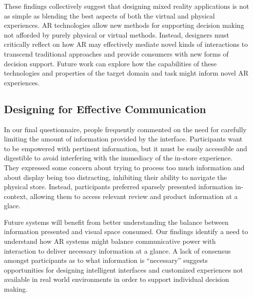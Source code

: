 These findings collectively suggest that designing mixed reality applications is not as simple as blending the best aspects of both the virtual and physical experiences. AR technologies allow new methods for supporting decision making not afforded by purely physical or virtual methods. Instead, designers must critically reflect on how AR may effectively mediate novel kinds of interactions to transcend traditional approaches and provide consumers with new forms of decision support. Future work can explore how the capabilities of these technologies and properties of the target domain and task might inform novel AR experiences.

\subsection{Designing for Effective Communication}
In our final questionnaire, people frequently commented on the need for carefully limiting the amount of information provided by the interface.  %
Participants want to be empowered with pertinent information, but it must be easily accessible and digestible to avoid interfering with the immediacy of the in-store experience. They expressed some concern about trying to process too much information and about display being too distracting, inhibiting their ability to navigate the physical store. Instead, participants preferred sparsely presented information in-context, allowing them to access relevant review and product information at a glace. 

Future systems will benefit from better understanding the balance between information presented and visual space consumed. 
Our findings identify a need to understand how AR systems might balance communicative power with interaction to deliver necessary information at a glance. A lack of consensus amongst participants as to what information is ``necessary'' suggests opportunities for designing intelligent interfaces and customized experiences not available in real world environments in order to support individual decision making. 

